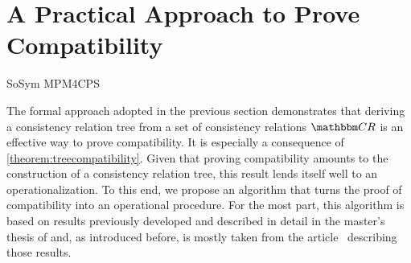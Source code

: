 \section{A Practical Approach to Prove Compatibility}
\label{chap:compatibility:practical_approach}


\begin{copiedFrom}{SoSym MPM4CPS}


The formal approach adopted in the previous section demonstrates that deriving a consistency relation tree from a set of consistency relations $\consistencyrelationset{CR}$ is an effective way to prove compatibility. It is especially a consequence of \autoref{theorem:treecompatibility}. 
Given that proving compatibility amounts to the construction of a consistency relation tree, this result lends itself well to an operationalization. To this end, we propose an algorithm that turns the proof of compatibility into an operational procedure. %
For the most part, this algorithm is based on results previously developed and described in detail in the master's thesis of \textcite{pepin2019ma} and, as introduced before, is mostly taken from the article~ describing those results.


\end{copiedFrom}
